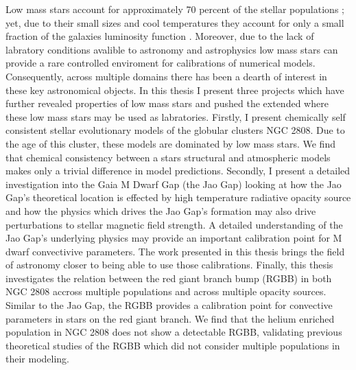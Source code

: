 Low mass stars account for approximately 70 percent of the stellar populations
\citep{Conroy2012}; yet, due to their small sizes and cool temperatures they
account for only a small fraction of the galaxies luminosity function
\citep{Laughlin1997}. Moreover, due to the lack of labratory conditions
avalible to astronomy and astrophysics low mass stars can provide a rare
controlled enviroment for calibrations of numerical models. Consequently,
across multiple domains there has been a dearth of interest in these key
astronomical objects. In this thesis I present three projects which have
further revealed properties of low mass stars and pushed the extended where
these low mass stars may be used as labratories. Firstly, I present chemically
self consistent stellar evolutionary models of the globular clusters NGC 2808.
Due to the age of this cluster, these models are dominated by low mass stars.
We find that chemical consistency between a stars structural and atmospheric
models makes only a trivial difference in model predictions. Secondly, I
present a detailed investigation into the Gaia M Dwarf Gap (the Jao Gap)
looking at how the Jao Gap's theoretical location is effected by high
temperature radiative opacity source and how the physics which drives the Jao
Gap's formation may also drive perturbations to stellar magnetic field
strength. A detailed understanding of the Jao Gap's underlying physics may
provide an important calibration point for M dwarf convectivive parameters. The
work presented in this thesis brings the field of astronomy closer to being
able to use those calibrations. Finally, this thesis investigates the relation
between the red giant branch bump (RGBB) in both NGC 2808 accross multiple
populations and across multiple opacity sources. Similar to the Jao Gap, the
RGBB provides a calibration point for convective parameters in stars on the red
giant branch. We find that the helium enriched population in NGC 2808 does not
show a detectable RGBB, validating previous theoretical studies of the RGBB
which did not consider multiple populations in their modeling. 
